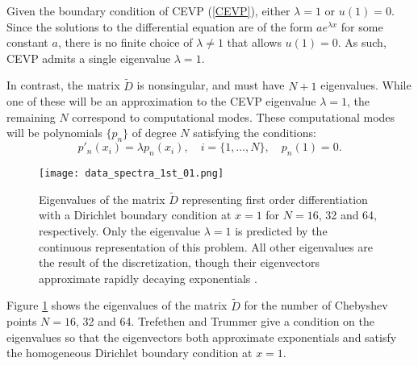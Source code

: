 \documentclass{sfuthesis}
\begin{document}
%

Given the boundary condition of CEVP (\ref{CEVP}), either $\lambda = 1$ or $u(1) = 0$.
Since the solutions to the differential equation are of the form $a e^{\lambda x}$ for some constant $a$, there is no finite choice of $\lambda \neq 1$ that allows $u(1) = 0$.
As such, CEVP admits a single eigenvalue $\lambda = 1$.

In contrast, the matrix $\tilde{D}$ is nonsingular, and must have $N+1$ eigenvalues.
While one of these will be an approximation to the CEVP eigenvalue $\lambda=1$, the remaining $N$ correspond to computational modes.
These computational modes will be polynomials $\{ p_n \}$ of degree $N$ satisfying the conditions:
\begin{equation}
p'_n(x_i) = \lambda p_n(x_i), \quad i = \{1, ..., N\}, \quad p_n(1) = 0.
\end{equation}

\begin{figure}
\texttt{[image: data\_spectra\_1st\_01.png]}
\caption{Eigenvalues of the matrix $\tilde{D}$ representing first order differentiation with a Dirichlet boundary condition at $x=1$ for $N = 16$, 32 and 64, respectively.
Only the eigenvalue $\lambda=1$ is predicted by the continuous representation of this problem.
All other eigenvalues are the result of the discretization, though their eigenvectors approximate rapidly decaying exponentials \cite{trefethentrummer1987}.}
\label{fig:Spectra1st_01}
\end{figure}

Figure \ref{fig:Spectra1st_01} shows the eigenvalues of the matrix $\tilde{D}$ for the number of Chebyshev points $N = 16$, 32 and 64.
Trefethen and Trummer \cite{trefethentrummer1987} give a condition on the eigenvalues so that the eigenvectors both approximate exponentials and satisfy the homogeneous Dirichlet boundary condition at $x=1$.
\end{document}
